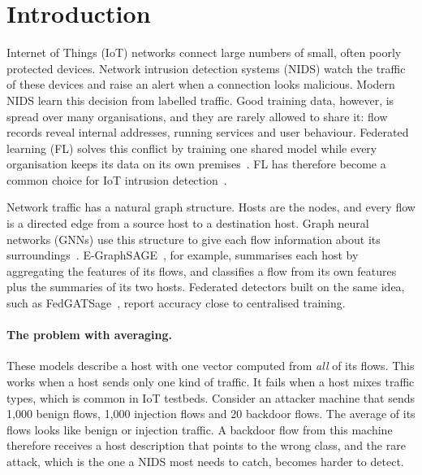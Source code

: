 \documentclass[pdflatex,sn-mathphys-num]{sn-jnl}
\begin{document}
\maketitle

\section{Introduction}\label{sec:intro}

Internet of Things (IoT) networks connect large numbers of small, often poorly protected devices. Network intrusion detection systems (NIDS) watch the traffic of these devices and raise an alert when a connection looks malicious. Modern NIDS learn this decision from labelled traffic. Good training data, however, is spread over many organisations, and they are rarely allowed to share it: flow records reveal internal addresses, running services and user behaviour. Federated learning (FL) solves this conflict by training one shared model while every organisation keeps its data on its own premises~\cite{mcmahan2017fedavg,kairouz2021advances}. FL has therefore become a common choice for IoT intrusion detection~\cite{nguyen2019diot,rahman2020iotids,campos2022evaluating,popoola2022zeroday}.

Network traffic has a natural graph structure. Hosts are the nodes, and every flow is a directed edge from a source host to a destination host. Graph neural networks (GNNs) use this structure to give each flow information about its surroundings~\cite{bilot2023survey,zhong2024survey}. E-GraphSAGE~\cite{lo2022egraphsage}, for example, summarises each host by aggregating the features of its flows, and classifies a flow from its own features plus the summaries of its two hosts. Federated detectors built on the same idea, such as FedGATSage~\cite{altfaily2025fedgatsage}, report accuracy close to centralised training.

\paragraph{The problem with averaging.} These models describe a host with one vector computed from \emph{all} of its flows. This works when a host sends only one kind of traffic. It fails when a host mixes traffic types, which is common in IoT testbeds. Consider an attacker machine that sends 1{,}000 benign flows, 1{,}000 injection flows and 20 backdoor flows. The average of its flows looks like benign or injection traffic. A backdoor flow from this machine therefore receives a host description that points to the wrong class, and the rare attack, which is the one a NIDS most needs to catch, becomes harder to detect.
\end{document}
